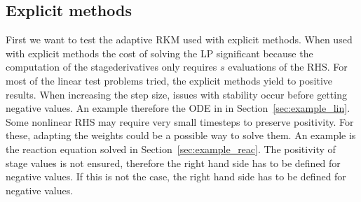 \documentclass[a4paper]{article}
\numberwithin{equation}{section}
\theoremstyle{plain}
\theoremstyle{definition}
\numberwithin{theorem}{section}
\newcommand{\1}{\mathbbm{1}}
\begin{document}
\subsection{Explicit methods}\label{sec:Ex_expl}
First we want to test the adaptive RKM used with explicit methods.  
When used with explicit methods the cost of solving the LP significant because the computation of the stagederivatives only requires $s$ evaluations of the RHS. 
For most of the linear test problems tried, the explicit methods yield to positive results.  
When increasing the step size, issues with stability occur before getting negative values.  
An example therefore the ODE in in Section~\ref{sec:example_lin}.
Some nonlinear RHS may require very small timesteps to preserve positivity.  
For these, adapting the weights could be a possible way to solve them. 
An example is the reaction equation solved in Section~\ref{sec:example_reac}.
The positivity of stage values is not ensured, therefore the right hand side has to be defined for negative values. If this is not the case, the right hand side has to be defined for negative values. 
\end{document}
